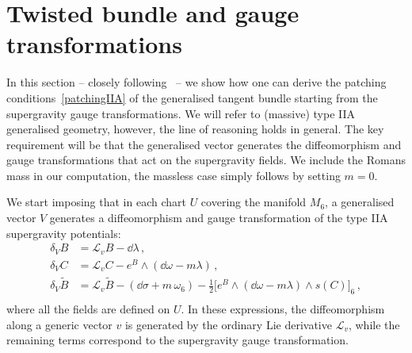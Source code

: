 \documentclass[debug]{phd}
\begin{document}
		\section{Twisted bundle and gauge transformations}\label{appsec:EGGgauge}
				In this section -- closely following~\cite{oscar1} -- we show how one can derive the patching conditions~\eqref{patchingIIA} of the generalised tangent bundle starting from the supergravity gauge transformations.
				We will refer to (massive) type IIA generalised geometry, however, the line of reasoning holds in general. 
				The key requirement will be that the generalised vector generates the diffeomorphism and gauge transformations that act on the supergravity fields. 
				We include the Romans mass in our computation, the massless case simply follows by setting $m=0$.

				We start imposing that in each chart $U$ covering the manifold $M_6$, a generalised vector $V$ generates a diffeomorphism and gauge transformation of the type IIA supergravity potentials:
						\begin{equation}\label{eq:gauge-trans-by-V-E1}
							\begin{split}
								\delta_{V} B &= \mathcal{L}_v B - \dd \lambda \, , \\
								\delta_{V} C &= \mathcal{L}_v C - e^B \wedge (\dd \omega - m \lambda) \, , \\
								\delta_{V} \tilde{B} &= \mathcal{L}_v \tilde{B} - (\dd \sigma + m \,\omega_6) - \tfrac{1}{2} \big[e^B \wedge (\dd \omega - m \lambda) \wedge s(C) \big]_6 \,,\\
							\end{split}
						\end{equation}
				where all the fields are defined on $U$.
				In these expressions, the diffeomorphism along a generic vector $v$ is generated by the ordinary Lie derivative $\mathcal{L}_v$, while the remaining terms correspond to the supergravity gauge transformation.
\end{document}
